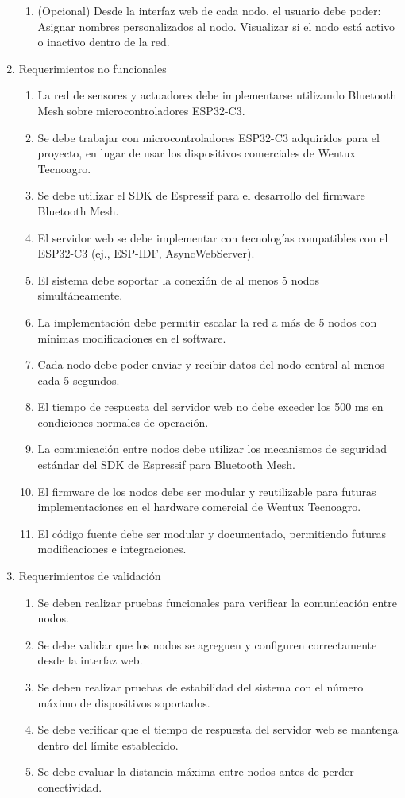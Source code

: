 \documentclass[
11pt, %
]{charter}
\begin{document}
\begin{enumerate}
\begin{enumerate}
		\item (Opcional) Desde la interfaz web de cada nodo, el usuario debe poder:
		\subitem Asignar nombres personalizados al nodo.
		\subitem Visualizar si el nodo está activo o inactivo dentro de la red.
	\end{enumerate}
	
\item Requerimientos no funcionales
	\begin{enumerate}
		\item La red de sensores y actuadores debe implementarse utilizando Bluetooth Mesh sobre microcontroladores ESP32-C3.
		\item Se debe trabajar con microcontroladores ESP32-C3 adquiridos para el proyecto, en lugar de usar los dispositivos comerciales de Wentux Tecnoagro.
		\item Se debe utilizar el SDK de Espressif para el desarrollo del firmware Bluetooth Mesh.
		\item El servidor web se debe implementar con tecnologías compatibles con el ESP32-C3 (ej., ESP-IDF, AsyncWebServer). %
		\item El sistema debe soportar la conexión de al menos 5 nodos simultáneamente.
		\item La implementación debe permitir escalar la red a más de 5 nodos con mínimas modificaciones en el software.
		\item Cada nodo debe poder enviar y recibir datos del nodo central al menos cada 5 segundos.		
		\item El tiempo de respuesta del servidor web no debe exceder los 500 ms en condiciones normales de operación.
		\item La comunicación entre nodos debe utilizar los mecanismos de seguridad estándar del SDK de Espressif para Bluetooth Mesh.
		\item El firmware de los nodos debe ser modular y reutilizable para futuras implementaciones en el hardware comercial de Wentux Tecnoagro.
		\item El código fuente debe ser modular y documentado, permitiendo futuras modificaciones e integraciones.
	\end{enumerate}
	
\item Requerimientos de validación
	\begin{enumerate}
		\item Se deben realizar pruebas funcionales para verificar la comunicación entre nodos.
		\item Se debe validar que los nodos se agreguen y configuren correctamente desde la interfaz web.
		\item Se deben realizar pruebas de estabilidad del sistema con el número máximo de dispositivos soportados.
		\item Se debe verificar que el tiempo de respuesta del servidor web se mantenga dentro del límite establecido.
		\item Se debe evaluar la distancia máxima entre nodos antes de perder conectividad.
	\end{enumerate}


\end{enumerate}
\end{document}
